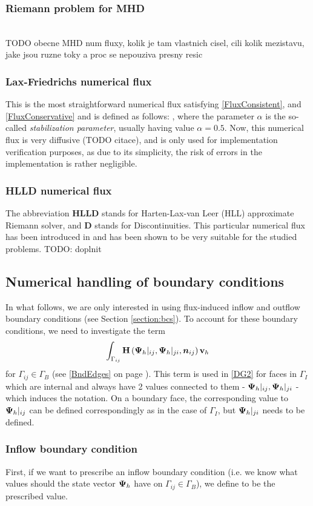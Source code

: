 \subsubsection{Riemann problem for MHD}
				\\ TODO obecne MHD num fluxy, kolik je tam vlastnich cisel, cili kolik mezistavu, jake jsou ruzne toky a proc se nepouziva presny resic
\subsubsection{Lax-Friedrichs numerical flux}
This is the most straightforward numerical flux satisfying \ref{FluxConsistent}, and \ref{FluxConservative} and is defined as follows:
\be
,
\ee
where the parameter $\alpha$ is the so-called \textit{stabilization parameter}, usually having value $\alpha = 0.5$. Now, this numerical flux is very diffusive (TODO citace), and is only used for implementation verification purposes, as due to its simplicity, the risk of errors in the implementation is rather negligible.
\subsubsection{HLLD numerical flux}
The abbreviation \textbf{HLLD} stands for Harten-Lax-van Leer (HLL) approximate Riemann solver, and \textbf{D} stands for Discontinuities.
This particular numerical flux has been introduced in \citep{hlld} and has been shown to be very suitable for the studied problems.
TODO: doplnit
\subsection{Numerical handling of boundary conditions}
In what follows, we are only interested in using flux-induced inflow and outflow boundary conditions (see Section \ref{section:bcs}).
To account for these boundary conditions, we need to investigate the term
$$
\int_{\Gamma_{ij}} \mathrm{\mathbf{H}}\left({\mathrm{\mathbf{\Psi}}_h}|_{ij}, {\mathrm{\mathbf{\Psi}}_h}|_{ji}, \mbox{\boldmath $n$}_{ij}\right) \mathrm{\mathbf{v}}_h
$$
for $\Gamma_{ij} \in \Gamma_B$ (see \ref{BndEdges} on page \pageref{BndEdges}).
This term is used in \ref{DG2} for faces in $\Gamma_I$ which are internal and always have 2 values connected to them - $\mathrm{\mathbf{\Psi}}_h|_{ij}, {\mathrm{\mathbf{\Psi}}_h}|_{ji}$ - which induces the notation. On a boundary face, the corresponding value to ${\mathrm{\mathbf{\Psi}}_h}|_{ij}$ can be defined correspondingly as in the case of $\Gamma_I$, but ${\mathrm{\mathbf{\Psi}}_h}|_{ji}$ needs to be defined.
\subsubsection{Inflow boundary condition}
First, if we want to prescribe an inflow boundary condition (i.e. we know what values should the state vector $\mathrm{\mathbf{\Psi}}_h$ have on ${\Gamma_{ij}}\in\Gamma_B$), we define
\be
\label{BC1} 
\ee
to be the prescribed value.

